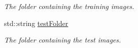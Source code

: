 \begin{DoxyCompactItemize}
\begin{DoxyCompactList}\small\item\em The folder containing the training images. \item\end{DoxyCompactList}\item 
\hypertarget{classclassifyImages_a7373134549cfc434db469f7e07e10f85}{
std::string \hyperlink{classclassifyImages_a7373134549cfc434db469f7e07e10f85}{testFolder}}
\label{classclassifyImages_a7373134549cfc434db469f7e07e10f85}

\begin{DoxyCompactList}\small\item\em The folder containing the test images. \item\end{DoxyCompactList}\end{DoxyCompactItemize}
